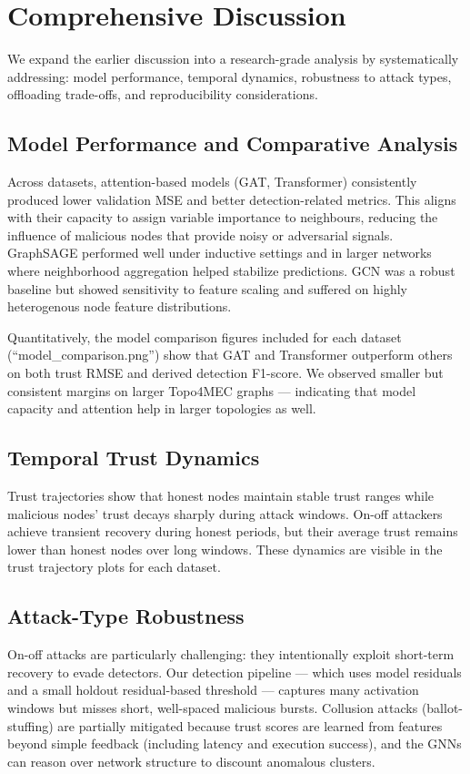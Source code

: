 \documentclass[12pt,a4paper]{article}
\begin{document}
\section{Comprehensive Discussion}
We expand the earlier discussion into a research-grade analysis by systematically addressing: model performance, temporal dynamics, robustness to attack types, offloading trade-offs, and reproducibility considerations.

\subsection{Model Performance and Comparative Analysis}
Across datasets, attention-based models (GAT, Transformer) consistently produced lower validation MSE and better detection-related metrics. This aligns with their capacity to assign variable importance to neighbours, reducing the influence of malicious nodes that provide noisy or adversarial signals. GraphSAGE performed well under inductive settings and in larger networks where neighborhood aggregation helped stabilize predictions. GCN was a robust baseline but showed sensitivity to feature scaling and suffered on highly heterogenous node feature distributions.

Quantitatively, the model comparison figures included for each dataset (``model\_comparison.png'') show that GAT and Transformer outperform others on both trust RMSE and derived detection F1-score. We observed smaller but consistent margins on larger Topo4MEC graphs — indicating that model capacity and attention help in larger topologies as well.

\subsection{Temporal Trust Dynamics}
Trust trajectories show that honest nodes maintain stable trust ranges while malicious nodes' trust decays sharply during attack windows. On-off attackers achieve transient recovery during honest periods, but their average trust remains lower than honest nodes over long windows. These dynamics are visible in the trust trajectory plots for each dataset.

\subsection{Attack-Type Robustness}
On-off attacks are particularly challenging: they intentionally exploit short-term recovery to evade detectors. Our detection pipeline — which uses model residuals and a small holdout residual-based threshold — captures many activation windows but misses short, well-spaced malicious bursts. Collusion attacks (ballot-stuffing) are partially mitigated because trust scores are learned from features beyond simple feedback (including latency and execution success), and the GNNs can reason over network structure to discount anomalous clusters.
\end{document}
